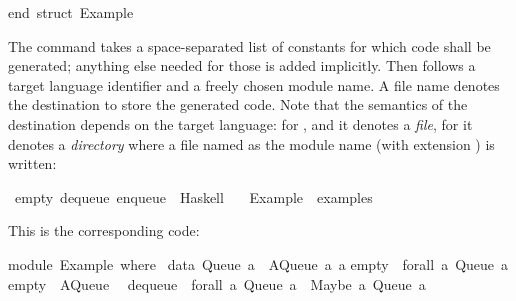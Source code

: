 \begin{isabellebody}
\begin{isamarkuptext}
\isanewline
end{\isacharsemicolon}\ {\isacharparenleft}{\isacharasterisk}struct\ Example{\isacharasterisk}{\isacharparenright}\isanewline%
\end{isamarkuptext}%
\isamarkuptrue%
%
\endisatagtypewriter
{\isafoldtypewriter}%
%
\isadelimtypewriter
%
\endisadelimtypewriter
%
\begin{isamarkuptext}%
\noindent The \hypertarget{command.export-code}{\hyperlink{command.export-code}{\mbox{}}} command takes a
  space-separated list of constants for which code shall be generated;
  anything else needed for those is added implicitly.  Then follows a
  target language identifier and a freely chosen module name.  A file
  name denotes the destination to store the generated code.  Note that
  the semantics of the destination depends on the target language: for
  ,  and  it denotes a \emph{file},
  for  it denotes a \emph{directory} where a file named as the
  module name (with extension ) is written:%
\end{isamarkuptext}%
\isamarkuptrue%
%
\isadelimquote
%
\endisadelimquote
%
\isatagquote
{}\isamarkupfalse%
\ empty\ dequeue\ enqueue\ \ Haskell\isanewline
\ \ \ Example\ \ {\isachardoublequoteopen}examples{\isacharslash}{\isachardoublequoteclose}%
\endisatagquote
{\isafoldquote}%
%
\isadelimquote
%
\endisadelimquote
%
\begin{isamarkuptext}%
\noindent This is the corresponding code:%
\end{isamarkuptext}%
\isamarkuptrue%
%
\isadelimtypewriter
%
\endisadelimtypewriter
%
\isatagtypewriter
%
\begin{isamarkuptext}%
module\ Example\ where\ {\isacharbraceleft}\isanewline
\isanewline
data\ Queue\ a\ {\isacharequal}\ AQueue\ {\isacharbrackleft}a{\isacharbrackright}\ {\isacharbrackleft}a{\isacharbrackright}{\isacharsemicolon}\isanewline
\isanewline
empty\ {\isacharcolon}{\isacharcolon}\ forall\ a{\isachardot}\ Queue\ a{\isacharsemicolon}\isanewline
empty\ {\isacharequal}\ AQueue\ {\isacharbrackleft}{\isacharbrackright}\ {\isacharbrackleft}{\isacharbrackright}{\isacharsemicolon}\isanewline
\isanewline
dequeue\ {\isacharcolon}{\isacharcolon}\ forall\ a{\isachardot}\ Queue\ a\ {\isacharminus}{\isachargreater}\ {\isacharparenleft}Maybe\ a{\isacharcomma}\ Queue\ a{\isacharparenright}{\isacharsemicolon}\isanewline

\end{isamarkuptext}
\end{isabellebody}
